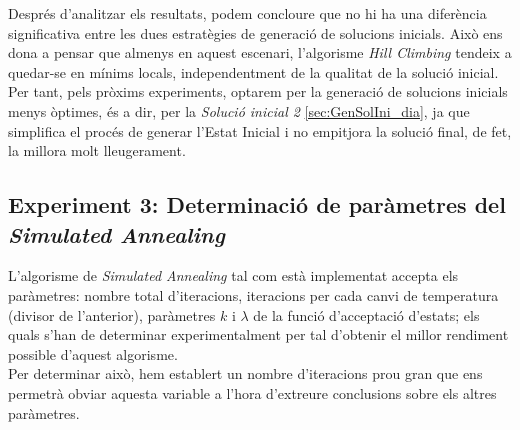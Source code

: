 \documentclass[a4paper]{article}
\begin{document}
	Després d'analitzar els resultats, podem concloure que no hi ha una diferència significativa entre les dues estratègies de generació de solucions inicials. Això ens dona a pensar que almenys en aquest escenari, l'algorisme \textit{Hill Climbing} tendeix a quedar-se en mínims locals, independentment de la qualitat de la solució inicial. Per tant, pels pròxims experiments, optarem per la generació de solucions inicials menys òptimes, és a dir, per la \textit{Solució inicial 2} \ref{sec:GenSolIni_dia}, ja que simplifica el procés de generar l'Estat Inicial i no empitjora la solució final, de fet, la millora molt lleugerament.
	
	\subsection{Experiment 3: Determinació de paràmetres del \textit{Simulated Annealing}}
	\label{sec:exp3}
	
	L'algorisme de \textit{Simulated Annealing} tal com està implementat accepta els paràmetres: nombre total d'iteracions, iteracions per cada canvi de temperatura (divisor de l'anterior), paràmetres $k$ i $\lambda$ de la funció d'acceptació d'estats; els quals s'han de determinar experimentalment per tal d'obtenir el millor rendiment possible d'aquest algorisme.\\
	
	Per determinar això, hem establert un nombre d'iteracions prou gran que ens permetrà obviar aquesta variable a l'hora d'extreure conclusions sobre els altres paràmetres.
	
\end{document}
